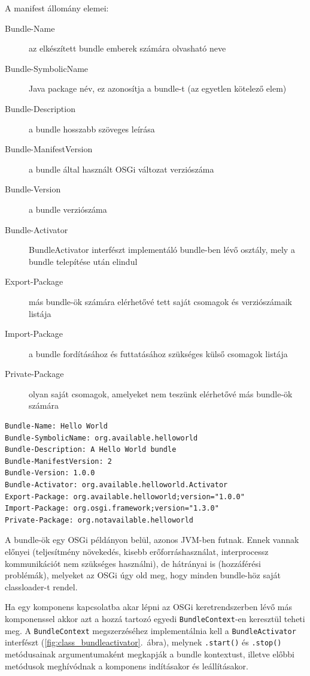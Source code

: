 A manifest állomány elemei:

\begin{description}
	\item[Bundle-Name] az elkészített bundle emberek számára olvasható neve
	\item[Bundle-SymbolicName] Java package név, ez azonosítja a bundle-t (az egyetlen kötelező elem)
	\item[Bundle-Description] a bundle hosszabb szöveges leírása
	\item[Bundle-ManifestVersion] a bundle által használt OSGi változat verziószáma
	\item[Bundle-Version] a bundle verziószáma
	\item[Bundle-Activator] BundleActivator interfészt implementáló bundle-ben lévő osztály, mely a bundle telepítése után elindul
	\item[Export-Package] más bundle-ök számára elérhetővé tett saját csomagok és verziószámaik listája
	\item[Import-Package] a bundle fordításához és futtatásához szükséges külső csomagok listája
	\item[Private-Package] olyan saját csomagok, amelyeket nem teszünk elérhetővé más bundle-ök számára
\end{description}

\begin{lstlisting}[label={lst:manifest}, caption=MANIFEST.MF,breaklines=true]
Bundle-Name: Hello World
Bundle-SymbolicName: org.available.helloworld
Bundle-Description: A Hello World bundle
Bundle-ManifestVersion: 2
Bundle-Version: 1.0.0
Bundle-Activator: org.available.helloworld.Activator
Export-Package: org.available.helloworld;version="1.0.0"
Import-Package: org.osgi.framework;version="1.3.0"
Private-Package: org.notavailable.helloworld
\end{lstlisting}


A bundle-ök egy OSGi példányon belül, azonos JVM-ben futnak. Ennek vannak előnyei (teljesítmény növekedés, kisebb erőforráshasználat, interprocessz kommunikációt nem szükséges használni), de hátrányai is (hozzáférési problémák), melyeket az OSGi úgy old meg, hogy minden bundle-höz saját classloader-t rendel.

Ha egy komponens kapcsolatba akar lépni az OSGi keretrendszerben lévő más komponenssel akkor azt a hozzá tartozó egyedi \texttt{BundleContext}-en keresztül teheti meg. A \texttt{BundleContext} megszerzéséhez implementálnia kell a \texttt{BundleActivator} interfészt (\ref{fig:class_bundleactivator}.~ábra), melynek \texttt{.start()} és \texttt{.stop()} metódusainak argumentumaként megkapják a bundle kontextust, illetve előbbi metódusok meghívódnak a komponens indításakor és leállításakor.

